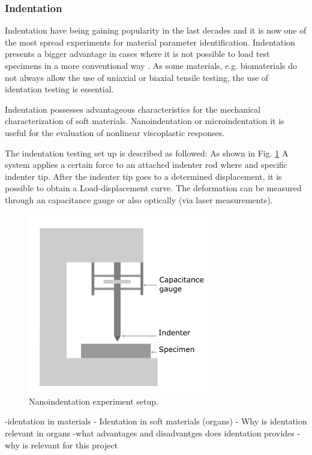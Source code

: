\subsubsection*{Indentation}
Indentation have being gaining popularity in the last decades and it is now one of
 the most spread experiments for material parameter identification.
 Indentation presents a bigger advantage in cases where it is not possible to load
 test specimens in a more conventional way \cite{Bergström2015}.   As some materials, e.g. biomaterials do not always 
 allow the use of uniaxial or biaxial tensile testing, the
 use of identation testing is essential.  

Indentation possesses advantageous characteristics for the mechanical characterization
of soft materials. \cite{Liu2009}
Nanoindentation or microindentation it is useful for the evaluation of
nonlinear viscoplastic responses. \cite{Bergström2015}

The indentation testing set up is described as followed: As shown in Fig. \ref{fig:Nanoindentation} 
A system applies a certain force to an attached indenter rod where and specific 
indenter tip. After the indenter tip goes to a determined displacement, 
it is possible to obtain a Load-displacement curve.
The deformation can be measured through an capacitance gauge \cite{Bergström2015}
or also optically (via laser measurements).

 \begin{figure}[th]
        \centering
        \includegraphics[width=8cm]{Images/nanoindentationbigletter}
        \decoRule
        \caption[Nanoindentation]{Nanoindentation experiment setup.}
        \label{fig:Nanoindentation}
        \end{figure}


-identation in materials
- Identation in soft materials (organs)
- Why is identation relevant in organs
-what advantages and disadvantges does identation provides
-why is relevant for this project 

